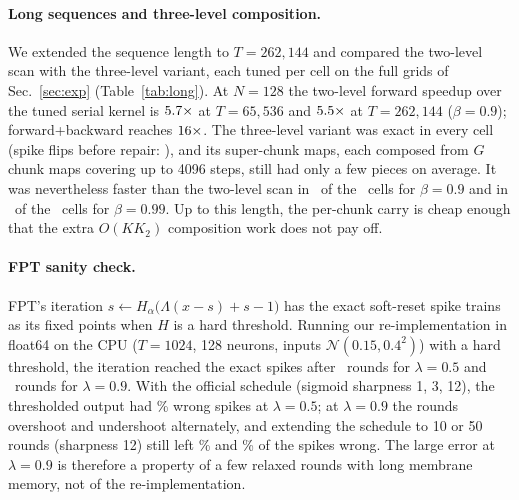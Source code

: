 \documentclass[10pt]{article}
\theoremstyle{remark}
\begin{document}
\paragraph{Long sequences and three-level composition.}
We extended the sequence length to $T=262{,}144$ and compared the two-level scan with the three-level variant, each tuned per cell on the full grids of Sec.~\ref{sec:exp} (Table~\ref{tab:long}). At $N=128$ the two-level forward speedup over the tuned serial kernel is $5.7\times$ at $T=65{,}536$ and $5.5\times$ at $T=262{,}144$ ($\beta=0.9$); forward+backward reaches $16\times$. The three-level variant was exact in every cell (spike flips before repair: \LongMaxFlipNine), and its super-chunk maps, each composed from $G$ chunk maps covering up to 4096 steps, still had only a few pieces on average. It was nevertheless faster than the two-level scan in \LongVFourBestNine\ of the \LongCellsNine\ cells for $\beta=0.9$ and in \LongVFourBestNineNine\ of the \LongCellsNineNine\ cells for $\beta=0.99$. Up to this length, the per-chunk carry is cheap enough that the extra $O(KK_2)$ composition work does not pay off.

\begin{table}[t]
\centering\small

\caption{Long sequences (RTX~5090). Columns 5--8 are speedups over the tuned serial kernel (forward: two-level and three-level exact scan; backward: affine scan; forward+backward: the better forward plus the scan backward). Each implementation is tuned per cell.}
\label{tab:long}
\end{table}

\paragraph{FPT sanity check.} FPT's iteration $s\leftarrow H_\alpha\big(\Lambda(x-s)+s-1\big)$ has the exact soft-reset spike trains as its fixed points when $H$ is a hard threshold. Running our re-implementation in float64 on the CPU ($T=1024$, 128 neurons, inputs $\mathcal N(0.15,0.4^2)$) with a hard threshold, the iteration reached the exact spikes after \FptHardRoundsHalf\ rounds for $\lambda=0.5$ and \FptHardRoundsNine\ rounds for $\lambda=0.9$. With the official schedule (sigmoid sharpness 1, 3, 12), the thresholded output had \FptHalfDetErrCpu\% wrong spikes at $\lambda=0.5$; at $\lambda=0.9$ the rounds overshoot and undershoot alternately, and extending the schedule to 10 or 50 rounds (sharpness 12) still left \FptExtTenErr\% and \FptExtFiftyErr\% of the spikes wrong. The large error at $\lambda=0.9$ is therefore a property of a few relaxed rounds with long membrane memory, not of the re-implementation.
\end{document}
